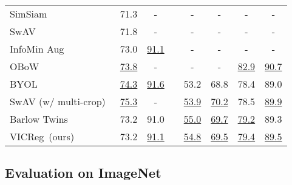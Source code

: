 \documentclass{article}
\newcommand{\algo}{VICReg}
\begin{document}
\begin{table}[t]
\begin{tabular}{ @{} l cc c cccc @{} }
	    SimSiam~\cite{chen2020simsiam}          & 71.3 & -      && -      & -      & -      & - \\
	    SwAV~\cite{caron2020swav}               & 71.8 & -      && - & - & - & - \\
	    InfoMin Aug~\cite{tian2020makes}        & 73.0 & \underline{91.1}   && -      & -      & -      & - \\
	    OBoW \cite{gidaris2021obow}             & \underline{73.8} & -         && -    & -    & \underline{82.9} & \underline{90.7} \\
	    BYOL~\cite{grill2020byol}               & \underline{74.3} & \underline{91.6}   && 53.2 & 68.8 & 78.4 & 89.0 \\
	    SwAV (w/ multi-crop)~\cite{caron2020swav}               & \underline{75.3} & -      && \underline{53.9} & \underline{70.2} & 78.5 & \underline{89.9} \\
	    Barlow Twins~\cite{zbontar2021barlow}   & 73.2 & 91.0 && \underline{55.0} & \underline{69.7} & \underline{79.2} & 89.3 \\
\algo \ (ours)                          & 73.2 & \underline{91.1} && \underline{54.8} & \underline{69.5} & \underline{79.4} & \underline{89.5} \\
      \bottomrule
    \end{tabular}
\end{table}

\subsection{Evaluation on ImageNet} \label{sec:eval_imagenet}
\end{document}
